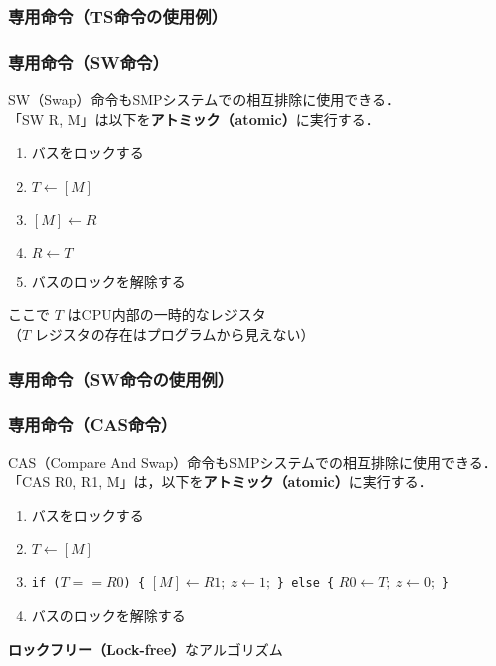 \documentclass[unicode]{beamer}                   %
\begin{document}
\begin{frame}
  \frametitle{専用命令（TS命令の使用例）}
\end{frame}

\begin{frame}
  \frametitle{専用命令（SW命令）}
  SW（Swap）命令もSMPシステムでの相互排除に使用できる．\\
  「SW  R, M」は以下を{\bf アトミック（atomic）}に実行する．
  \begin{enumerate}
  \item バスをロックする
  \item $T \leftarrow [M]$
  \item $[M] \leftarrow R$
  \item $R \leftarrow T$
  \item バスのロックを解除する
  \end{enumerate}
  ここで $T$ はCPU内部の一時的なレジスタ\\
  （$T$ レジスタの存在はプログラムから見えない）
\end{frame}

\begin{frame}
  \frametitle{専用命令（SW命令の使用例）}
\end{frame}

\begin{frame}
  \frametitle{専用命令（CAS命令）}
  CAS（Compare And Swap）命令もSMPシステムでの相互排除に使用できる．
  「CAS  R0, R1, M」は，以下を{\bf アトミック（atomic）}に実行する．
  \begin{enumerate}
  \item バスをロックする
  \item $T \leftarrow [M]$
  \item {\tt if ($T==R0$) \{} $[M] \leftarrow R1;~ z \leftarrow 1;$
    {\tt \} else \{} $R0 \leftarrow T;~  z \leftarrow 0;$ {\tt \}}
  \item バスのロックを解除する
  \end{enumerate}
  \vspace{1em}
  {\bf ロックフリー（Lock-free）}なアルゴリズム
\end{frame}
\end{document}
